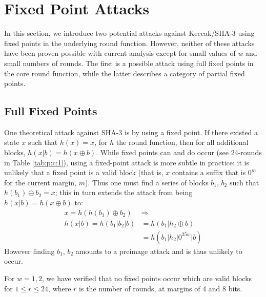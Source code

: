\documentclass[10pt,twocolumn,twoside]{pnas-new}
\begin{document}

\section{Fixed Point Attacks} \label{sec:fixed}

In this section, we introduce two potential attacks against Keccak/SHA-3 using
fixed points in the underlying round function. However, neither of these
attacks have been proven possible with current analysis except for small values
of $w$ and small numbers of rounds. The first is a possible attack using full
fixed points in the core round function, while the latter describes a category
of partial fixed points.


\subsection{Full Fixed Points} \label{sec:f:full}


One theoretical attack against SHA-3 is by using a fixed point. If there
existed a state $x$ such that $h(x) = x$, for $h$ the round function, then
for all additional blocks, $h(x | b) = h(x \oplus b)$. While fixed points can
and do occur (see 24-rounds in Table \ref{tab:p:c:1}), using a fixed-point
attack is more subtle in practice: it is unlikely that a fixed point is a valid
block (that is, $x$ contains a suffix that is $0^{m}$ for the current margin,
$m$). Thus one must find a series of blocks $b_1$, $b_2$ such that
$h(b_1) \oplus b_2 = x$; this in turn extends the attack from being
$h(x | b) = h(x \oplus b)$ to:
\begin{align*}
    x = h(h(b_1) \oplus b_2) & \Rightarrow \\
    h(x | b) = h(b_1 | b_2 | b) & = h(b_1 | h_2 \oplus b) \\
    & = h(b_1 | h_2 | 0^{25w} | b)
\end{align*}
However finding $b_1$, $b_2$ amounts to a preimage attack and is thus unlikely
to occur.

For $w=1, 2$, we have verified that no fixed points occur which are valid blocks
for $1 \leq r \leq 24$, where $r$ is the number of rounds, at margins of 4 and
8 bits.
\end{document}
